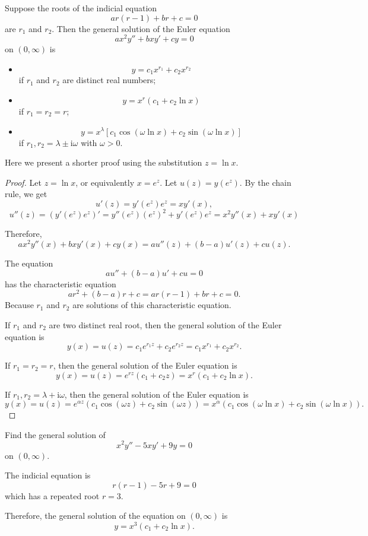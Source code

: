 \begin{theorem}
Suppose the roots of the indicial equation
\[ar(r-1)+br+c=0\]
are $r_1$ and $r_2$. Then the general solution of the Euler equation
\[ax^2y''+bxy'+cy=0\]
on $(0,\infty)$ is
\begin{itemize}
  \item 
  \[y= c_1x^{r_1}+c_2x^{r_2}\]
  if $r_1$ and $r_2$ are distinct real numbers;
  \item 
  \[y= x^{r}(c_1+c_2\ln x)\]
  if $r_1=r_2=r$;
  \item 
  \[y=x^{\lambda}\left[c_1\cos\left(\omega\ln x\right)+ c_2\sin\left(\omega\ln x \right)\right]\] 
  if $r_1,r_2=\lambda\pm \mathrm{i}\omega$ with $\omega>0$.
\end{itemize}
\end{theorem}
Here we present a shorter proof using the substitution $z=\ln x$.
\begin{proof}
  Let $z=\ln x$, or equivalently $x=e^z$.
  Let $u(z)=y(e^z)$. By the chain rule, we get
  \[
    u'(z)=y'(e^z)e^z=xy'(x),
  \]
  \[
    u''(z)=(y'(e^z)e^z)'=y''(e^z)(e^z)^2+y'(e^z)e^z=x^2y''(x)+xy'(x)
  \]

Therefore,
\[ax^2y''(x)+bxy'(x)+cy(x)=au''(z)+(b-a)u'(z)+cu(z).
\]

The equation
\[
  au''+(b-a)u'+cu=0
\]
has the characteristic equation
\[ar^2+(b-a)r+c=ar(r-1)+br+c=0.\]
Because $r_1$ and $r_2$ are solutions of this characteristic equation. 

If $r_1$ and $r_2$ are two distinct real root, then the general solution of the Euler equation is
\[y(x)=u(z)=c_1e^{r_1 z}+c_2e^{r_2 z}=c_1x^{r_1}+c_2x^{r_2}.\]

If $r_1=r_2=r$, then the general solution of the Euler equation is
\[y(x)=u(z)=e^{r z}(c_1+c_2z)=x^{r}(c_1+c_2\ln x).\]

If $r_1,r_2=\lambda+\mathrm{i}\omega$, then the general solution of the Euler equation is
\[y(x)=u(z)=e^{\alpha z}(c_1\cos(\omega z)+c_2\sin(\omega z))=x^{\alpha}(c_1\cos(\omega\ln x)+c_2\sin(\omega \ln x)).\]

\end{proof}

\begin{example}
  Find the general solution of
\[x^2y''-5xy'+9y=0\]
on $(0,\infty)$.
\end{example}
\begin{solution}
The indicial equation is
\[r(r-1)-5r+9=0\]
which has a repeated root $r=3$.

Therefore, the general solution of the equation on $(0,\infty)$ is
\[y=x^3(c_1+c_2 \ln x).\]
\end{solution}

